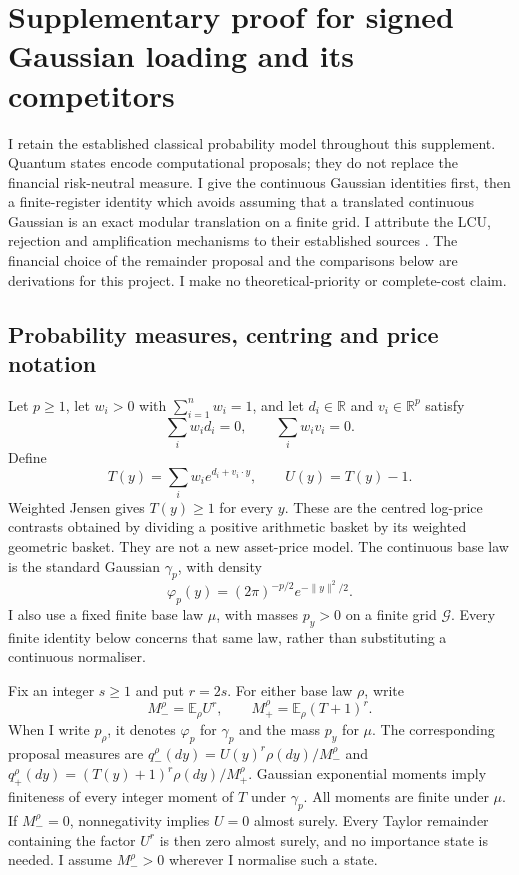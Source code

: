 \section{Supplementary proof for signed Gaussian loading and its competitors}
\label{sec:signed-gaussian-loading-supplement}

I retain the established classical probability model throughout this
supplement. Quantum states encode computational proposals; they do not
replace the financial risk-neutral measure. I give the continuous
Gaussian identities first, then a finite-register identity which avoids
assuming that a translated continuous Gaussian is an exact modular
translation on a finite grid. I attribute the LCU, rejection and
amplification mechanisms to their established sources
\citep{rosenkranz2025,ozols2013,brassard}. The financial choice of the
remainder proposal and the comparisons below are derivations for this
project. I make no theoretical-priority or complete-cost claim.

\subsection{Probability measures, centring and price notation}

Let $p\geq1$, let $w_i>0$ with $\sum_{i=1}^n w_i=1$, and let
$d_i\in\mathbb R$ and $v_i\in\mathbb R^p$ satisfy
\begin{equation}
 \sum_iw_i d_i=0,\qquad \sum_iw_i v_i=0.
 \label{eq:sg-centering}
\end{equation}
Define
\[
 T(y)=\sum_iw_i e^{d_i+v_i\cdot y},\qquad U(y)=T(y)-1.
\]
Weighted Jensen gives $T(y)\geq1$ for every $y$. These are the centred
log-price contrasts obtained by dividing a positive arithmetic basket
by its weighted geometric basket. They are not a new asset-price model.
The continuous base law is the standard Gaussian $\gamma_p$, with density
\[
 \varphi_p(y)=(2\pi)^{-p/2}e^{-\|y\|^2/2}.
\]
I also use a fixed finite base law $\mu$, with masses $p_y>0$ on a
finite grid $\mathcal G$. Every finite identity below concerns that
same law, rather than substituting a continuous normaliser.

Fix an integer $s\geq1$ and put $r=2s$. For either base law $\rho$,
write
\[
 M_-^\rho=\mathbb E_\rho U^r,\qquad
 M_+^\rho=\mathbb E_\rho(T+1)^r.
\]
When I write $p_\rho$, it denotes $\varphi_p$ for $\gamma_p$ and
the mass $p_y$ for $\mu$. The corresponding proposal measures are
$q_-^\rho(dy)=U(y)^r\rho(dy)/M_-^\rho$ and
$q_+^\rho(dy)=(T(y)+1)^r\rho(dy)/M_+^\rho$.
Gaussian exponential moments imply finiteness of every integer
moment of $T$ under $\gamma_p$. All moments are finite under $\mu$.
If $M_-^\rho=0$, nonnegativity implies $U=0$ almost surely. Every
Taylor remainder containing the factor $U^r$ is then zero almost surely,
and no importance state is needed. I assume $M_-^\rho>0$ wherever
I normalise such a state.

